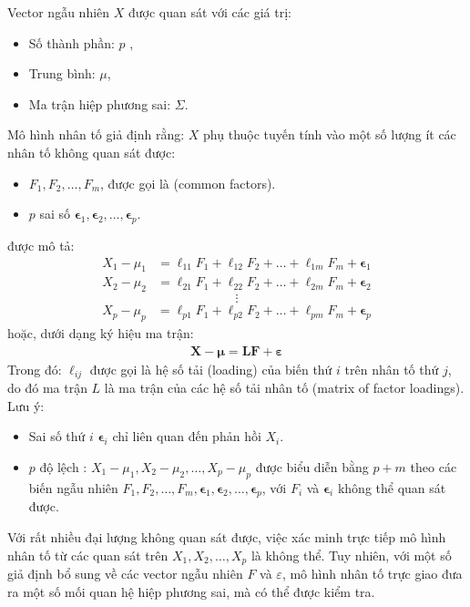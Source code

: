 Vector ngẫu nhiên \(X\) được quan sát với các giá trị:
\begin{itemize}
\item Số thành phần: \(p\) ,
\item Trung bình: \(\mu\),
\item Ma trận hiệp phương sai: \(\Sigma\).
\end{itemize}
Mô hình nhân tố giả định rằng: \(X\) phụ thuộc tuyến tính vào một số lượng ít các nhân tố không quan sát được:
\begin{itemize}
\item \(F_1, F_2, \ldots, F_m\), được gọi là  (common factors).
\item \(p\) sai số  \(\boldsymbol{\epsilon}_1, \boldsymbol{\epsilon}_2, \ldots, \boldsymbol{\epsilon}_p\).
\end{itemize}
 được mô tả:
\begin{eqnarray}
X_1 - \mu_1 &= \ell_{11}F_1 + \ell_{12}F_2 + \ldots + \ell_{1m}F_m + \boldsymbol{\epsilon}_1\\
X_2 - \mu_2 &= \ell_{21}F_1 + \ell_{22}F_2 + \ldots + \ell_{2m}F_m + \boldsymbol{\epsilon}_2
\end{eqnarray}
\[\vdots\]
\begin{eqnarray}
X_p - \mu_p &= \ell_{p1}F_1 + \ell_{p2}F_2 + \ldots + \ell_{pm}F_m + \boldsymbol{\epsilon}_p
\end{eqnarray}
hoặc, dưới dạng ký hiệu ma trận:
\begin{eqnarray}
\mathbf{X} - \boldsymbol{\mu} = \mathbf{L}\mathbf{F} + \boldsymbol{\varepsilon}
\end{eqnarray}
Trong đó: \(\ell_{ij}\) được gọi là hệ số tải (loading) của biến thứ \(i\) trên nhân tố thứ \(j\), do đó ma trận \(L\) là ma trận của các hệ số tải nhân tố (matrix of factor loadings).
Lưu ý: 
\begin{itemize}
    \item Sai số thứ \(i\) \(\boldsymbol{\epsilon}_i\) chỉ liên quan đến phản hồi \(X_i\).
    \item \(p\) độ lệch : \(X_1 - \mu_1, X_2 - \mu_2, \ldots, X_p - \mu_p\) được biểu diễn bằng \(p + m\) theo các biến ngẫu nhiên  \(F_1, F_2, \ldots, F_m, \boldsymbol{\epsilon}_1, \boldsymbol{\epsilon}_2, \ldots, \boldsymbol{\epsilon}_p\), với \(F_i\) và \(\boldsymbol{\epsilon}_i\) không thể quan sát được.
\end{itemize}

Với rất nhiều đại lượng không quan sát được, việc xác minh trực tiếp mô hình nhân tố từ các quan sát trên \(X_1, X_2, \ldots, X_p\) là không thể. Tuy nhiên, với một số giả định bổ sung về các vector ngẫu nhiên \(F\) và \(\varepsilon\), mô hình nhân tố trực giao đưa ra một số mối quan hệ hiệp phương sai, mà có thể được kiểm tra.

